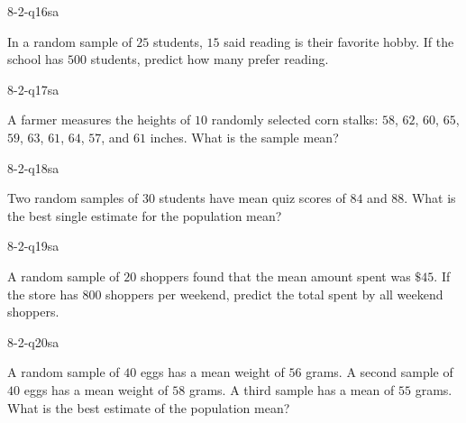 
\begin{practiceQuestion}{8-2-q16}{sa}
\begin{questionText}
In a random sample of $25$ students, $15$ said reading is their favorite hobby. If the school has $500$ students, predict how many prefer reading.
\end{questionText}
\end{practiceQuestion}

\begin{practiceQuestion}{8-2-q17}{sa}
\begin{questionText}
A farmer measures the heights of $10$ randomly selected corn stalks: $58$, $62$, $60$, $65$, $59$, $63$, $61$, $64$, $57$, and $61$ inches. What is the sample mean?
\end{questionText}
\end{practiceQuestion}

\begin{practiceQuestion}{8-2-q18}{sa}
\begin{questionText}
Two random samples of $30$ students have mean quiz scores of $84$ and $88$. What is the best single estimate for the population mean?
\end{questionText}
\end{practiceQuestion}

\begin{practiceQuestion}{8-2-q19}{sa}
\begin{questionText}
A random sample of $20$ shoppers found that the mean amount spent was $\$45$. If the store has $800$ shoppers per weekend, predict the total spent by all weekend shoppers.
\end{questionText}
\end{practiceQuestion}

\begin{practiceQuestion}{8-2-q20}{sa}
\begin{questionText}
A random sample of $40$ eggs has a mean weight of $56$ grams. A second sample of $40$ eggs has a mean weight of $58$ grams. A third sample has a mean of $55$ grams. What is the best estimate of the population mean?
\end{questionText}
\end{practiceQuestion}


